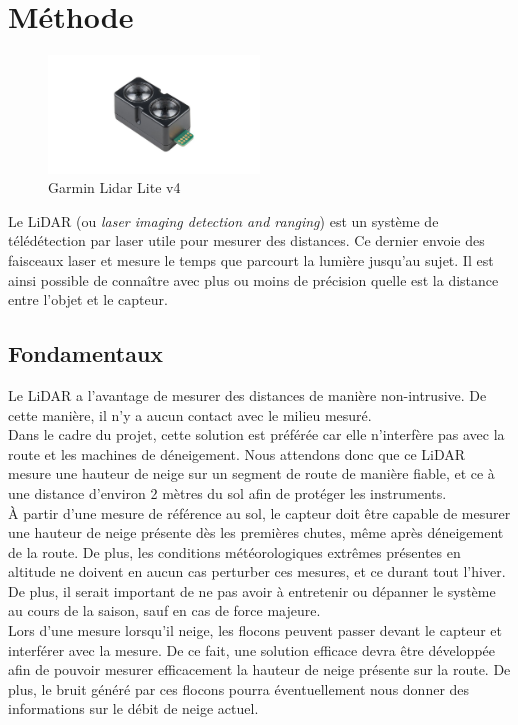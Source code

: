 \section{Méthode}

\begin{figure}[H]
    \centering
    \includegraphics[width=0.5\textwidth]{Images/LiDAR/GarminLiDARLiteV4.jpg}
    \caption{Garmin Lidar Lite v4}
    \label{LiDARLiteV4}
\end{figure}

Le LiDAR (ou \emph{laser imaging detection and ranging}) est un système de télédétection par laser
utile pour mesurer des distances. Ce dernier envoie des faisceaux laser et mesure le temps que 
parcourt la lumière jusqu'au sujet. Il est ainsi possible de connaître avec plus ou moins de précision
quelle est la distance entre l'objet et le capteur.

\subsection{Fondamentaux}
Le LiDAR a l'avantage de mesurer des distances de manière non-intrusive. De cette manière, il n'y a 
aucun contact avec le milieu mesuré.\\
Dans le cadre du projet, cette solution est préférée car elle n'interfère pas avec la route et les 
machines de déneigement. Nous attendons donc que ce LiDAR mesure une hauteur de neige sur un 
segment de route de manière fiable, et ce à une distance d'environ 2 mètres du sol afin de protéger 
les instruments.\\
À partir d'une mesure de référence au sol, le capteur doit être capable de mesurer une hauteur de neige
présente dès les premières chutes, même après déneigement de la route. De plus, les conditions
météorologiques extrêmes présentes en altitude ne doivent en aucun cas perturber ces mesures, et ce
durant tout l'hiver. De plus, il serait important de ne pas avoir à entretenir ou dépanner le système
au cours de la saison, sauf en cas de force majeure.\\
Lors d'une mesure lorsqu'il neige, les flocons peuvent passer devant le capteur et interférer avec la
mesure. De ce fait, une solution efficace devra être développée afin de pouvoir mesurer efficacement
la hauteur de neige présente sur la route. De plus, le bruit généré par ces flocons pourra éventuellement
nous donner des informations sur le débit de neige actuel.

